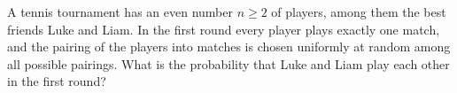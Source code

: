 A tennis tournament has an even number $n\ge2$ of players, among them the best friends Luke and Liam. In the first round every player plays exactly one match, and the pairing of the players into matches is chosen uniformly at random among all possible pairings. What is the probability that Luke and Liam play each other in the first round?
